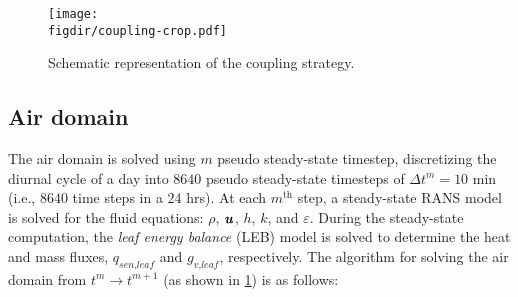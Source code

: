 \begin{figure}[t]
	\centering
	\texttt{[image: \\figdir/coupling-crop.pdf]}
	\caption{Schematic representation of the coupling strategy.}
	\label{fig:coupling}
\end{figure}


\subsection{Air domain}

The air domain is solved using $m$ pseudo steady-state timestep, discretizing the diurnal cycle of a day into $\num{8640}$ pseudo steady-state timesteps of $\Delta t^m = 10$ min (i.e., $8640$ time steps in a $24$ hrs). At each $m^{\mathrm{th}}$ step, a steady-state RANS model is solved for the fluid equations: $\rho$, $\textbf{\textit{u}}$, $h$, $k$, and $\varepsilon$. During the steady-state computation, the \textit{leaf energy balance} (LEB) model is solved to determine the heat and mass fluxes, $q_{\textit{sen,leaf}}$ and $g_{\textit{v,leaf}}$, respectively. The algorithm for solving the air domain from $t^{m}\rightarrow t^{m+1}$ (as shown in \cref{fig:coupling}) is as follows:
